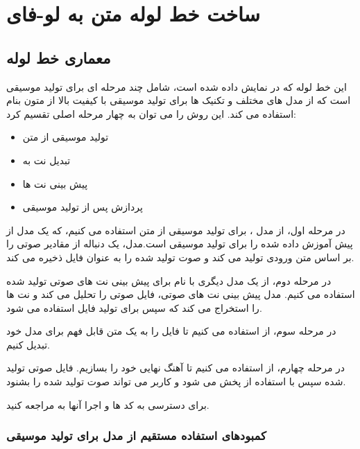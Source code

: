 
\chapter{ساخت خط لوله متن به لو-فای}
\section{معماری خط‌ لوله}

این خط لوله  که در  نمایش داده شده است، شامل چند مرحله ای برای تولید موسیقی است که از مدل های مختلف و تکنیک ها برای تولید موسیقی با کیفیت بالا از متون بنام استفاده می کند. این روش را می توان به چهار مرحله اصلی تقسیم کرد:
\begin{itemize}
      \item  تولید موسیقی از متن
      \item  تبدیل نت به 
      \item پیش بینی نت ها
      \item پردازش پس از تولید موسیقی
\end{itemize}

در مرحله اول، از مدل   \cite{copet2023simple}، برای تولید موسیقی از متن استفاده می کنیم، که یک مدل از پیش آموزش‌ داده شده را برای تولید موسیقی است.مدل، یک دنباله از مقادیر صوتی را بر اساس متن ورودی تولید می کند و صوت تولید شده را به عنوان فایل  ذخیره می کند.

در مرحله دوم، از یک مدل دیگری با نام  \cite{2022_BittnerBRME_LightweightNoteTranscription_ICASSP} برای پیش بینی نت های صوتی تولید شده استفاده می کنیم. مدل پیش بینی نت های صوتی، فایل صوتی را تحلیل می کند و نت ها را استخراج می کند که سپس برای تولید فایل  استفاده می شود.


در مرحله سوم، از   استفاده می کنیم تا فایل  را به یک متن قابل فهم برای مدل خود تبدیل کنیم.

در مرحله چهارم، از  استفاده می کنیم تا آهنگ نهایی خود را بسازیم.
فایل صوتی تولید شده سپس با استفاده از  پخش می شود و کاربر می تواند صوت تولید شده را بشنود.

برای دسترسی به کد ها و اجرا آنها به  مراجعه کنید.

\subsection{کمبودهای استفاده مستقیم از مدل  برای تولید موسیقی}

